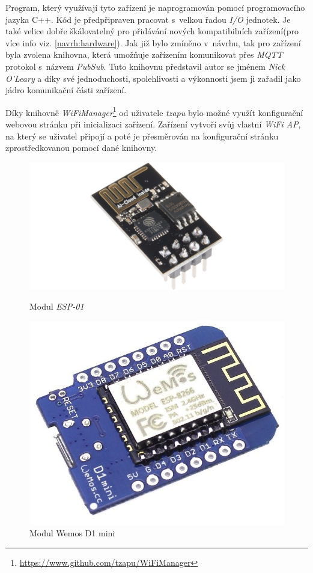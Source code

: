 Program, který využívají tyto zařízení je naprogramován pomocí programovacího jazyka C++.
Kód je předpřipraven pracovat s~velkou řadou \emph{I/O} jednotek.
Je také velice dobře škálovatelný pro přidávání nových kompatibilních zařízení(pro více info viz. \ref{navrh:hardware}).
Jak již bylo zmíněno v~návrhu, tak pro zařízení byla zvolena knihovna, která umožňuje zařízením komunikovat přes \emph{MQTT} protokol s~názvem \emph{PubSub}.
Tuto knihovnu představil autor se jménem \emph{Nick O'Leary} a díky své jednoduchosti, spolehlivosti a výkonnosti jsem ji zařadil jako jádro komunikační části zařízení.

Díky knihovně \emph{WiFiManager}\footnote{\url{https://www.github.com/tzapu/WiFiManager}} od uživatele \emph{tzapu} bylo možné využít konfigurační webovou stránku při inicializaci zařízení.
Zařízení vytvoří svůj vlastní \emph{WiFi AP}, na který se uživatel připojí a poté je přesměrován na konfigurační stránku zprostředkovanou pomocí dané knihovny.

\begin{figure}[hbt]
  \centering
  \includegraphics[width=.8\linewidth]{obrazky-figures/esp-01.png}
  \caption{Modul \emph{ESP-01}}
  \label{figure:esp01}
  \endminipage

  \hfill
  \centering
  \includegraphics[width=.7\linewidth]{obrazky-figures/wemos.jpg}
  \caption{Modul Wemos D1 mini}
  \label{figure:wemos}
  \endminipage
\end{figure}

